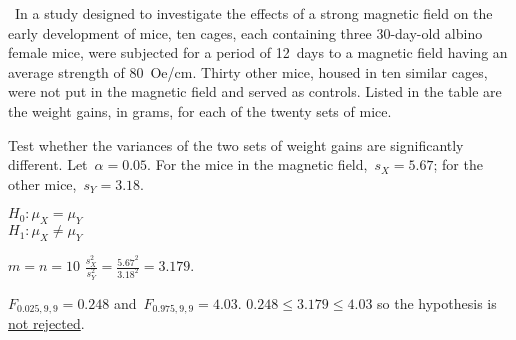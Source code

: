 \begin{problem}
  ~In a study designed to investigate the effects of a strong magnetic field on the early development of mice, ten cages, each containing three 30-day-old albino female mice, were subjected for a period of 12~days to a magnetic field having an average strength of 80~Oe/cm. Thirty other mice, housed in ten similar cages, were not put in the magnetic field and served as controls. Listed in the table are the weight gains, in grams, for each of the twenty sets of mice.

Test whether the variances of the two sets of weight gains are significantly different. Let~${\alpha = 0.05}$. For the mice in the magnetic field,~${s_X = 5.67}$; for the other mice,~${s_Y = 3.18}$.
\end{problem}

\noindent
${H_0: \mu_{X} = \mu_{Y}}$ \\
${H_1:  \mu_{X} \ne \mu_{Y}}$

\noindent
${m = n = 10}$  ${\frac{s^{2}_{X}}{s^{2}_{Y}} = \frac{5.67^2}{3.18^2} = 3.179}$.

\noindent
${F_{0.025,9,9} = 0.248}$ and~${F_{0.975,9,9} = 4.03}$.  ${0.248 \leq 3.179 \leq 4.03}$ so the hypothesis is \underline{not rejected}.

